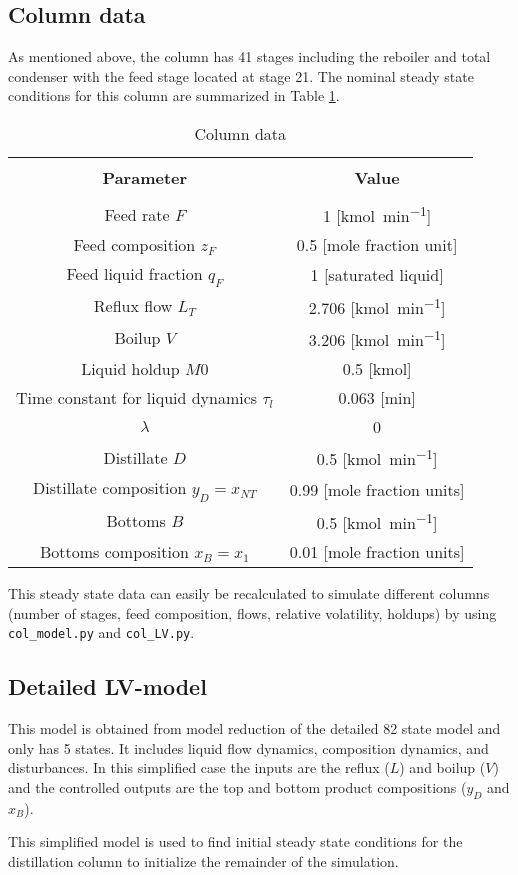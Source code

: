 \subsection{Column data}
As mentioned above, the column has 41 stages including the reboiler and total condenser with the feed stage located at stage 21.
The nominal steady state conditions for this column are summarized in Table \ref{tab:column_data}.
\begin{table}[H]
	\centering
	\caption{Column data}
	\begin{tabular}{c c}
		\toprule[0.5mm]\\
		\textbf{Parameter} & \textbf{Value}\\
		\midrule[0.5mm]\\
		Feed rate $F$ & 1 [\si{\kilo\mole\per\minute}]\\
		Feed composition $z_F$ & 0.5 [mole fraction unit]\\
		Feed liquid fraction $q_F$ & 1 [saturated liquid]\\
		Reflux flow $L_T$ & 2.706 [\si{\kilo\mole\per\minute}]\\
		Boilup $V$ & 3.206 [\si{\kilo\mole\per\minute}]\\
		Liquid holdup $M0$ & 0.5 [\si{\kilo\mole}]\\
		Time constant for liquid dynamics $\tau_l$ & 0.063 [\si{\minute}]\\
		$\lambda$ & 0 \\
		Distillate $D$ & 0.5 [\si{\kilo\mole\per\minute}]\\
		Distillate composition $y_D=x_{NT}$ & 0.99 [mole fraction units]\\
		Bottoms $B$ & 0.5 [\si{\kilo\mole\per\minute}]\\
		Bottoms composition $x_B=x_1$ & 0.01 [mole fraction units]\\
		\bottomrule[0.2mm]
	\end{tabular}
	\label{tab:column_data}
\end{table}
This steady state data can easily be recalculated to simulate different columns (number of stages, feed composition, flows, relative volatility, holdups) by using \texttt{col\_model.py} and \texttt{col\_LV.py}. 
\subsection{Detailed LV-model}
This model is obtained from model reduction of the detailed 82 state model and only has 5 states.
It includes liquid flow dynamics, composition dynamics, and disturbances.
In this simplified case the inputs are the reflux ($L$) and boilup ($V$) and the controlled outputs are the top and bottom product compositions ($y_D$ and $x_B$).
\par
This simplified model is used to find initial steady state conditions for the distillation column to initialize the remainder of the simulation.
